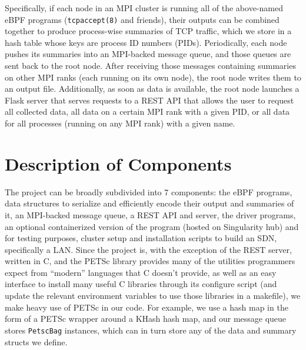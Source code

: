 \documentclass[11pt]{article}
\begin{document}
Specifically, if each node in an MPI cluster is running all of the above-named eBPF programs (\lstinline{tcpaccept(8)} and friends), their outputs can be combined together to produce process-wise summaries of TCP traffic, which we store in a hash table whose keys are process ID numbers (PIDs). Periodically, each node pushes its summaries into an MPI-backed message queue, and those queues are sent back to the root node. After receiving those messages containing summaries on other MPI ranks (each running on its own node), the root node writes them to an output file. Additionally, as soon as data is available, the root node launches a Flask server that serves requests to a REST API that allows the user to request all collected data, all data on a certain MPI rank with a given PID, or all data for all processes (running on any MPI rank) with a given name.
\section{Description of Components}

The project can be broadly subdivided into 7 components: the eBPF programs, data structures to serialize and efficiently encode their output and summaries of it, an MPI-backed message queue, a REST API and server, the driver programs, an optional containerized version of the program (hosted on Singularity hub) and for testing purposes, cluster setup and installation scripts to build an SDN, specifically a LAN. Since the project is, with the exception of the REST server, written in C, and the PETSc library provides many of the utilities programmers expect from ``modern'' languages that C doesn't provide, as well as an easy interface to install many useful C libraries through its configure script (and update the relevant environment variables to use those libraries in a makefile), we make heavy use of PETSc in our code. For example, we use a hash map in the form of a PETSc wrapper around a KHash hash map, and our message queue stores \lstinline{PetscBag} instances, which can in turn store any of the data and summary structs we define.
\end{document}
